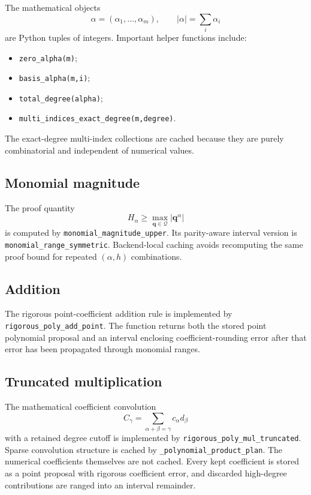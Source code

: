 \documentclass[11pt]{article}
\newcommand{\Qdom}{\mathcal{Q}}
\newcommand{\qv}{\mathbf{q}}
\begin{document}
The mathematical objects
\[
  \alpha=(\alpha_1,\ldots,\alpha_m),
  \qquad
  |\alpha|=\sum_i\alpha_i
\]
are Python tuples of integers.  Important helper functions include:
\begin{itemize}[leftmargin=*]
\item \texttt{zero\_alpha(m)};
\item \texttt{basis\_alpha(m,i)};
\item \texttt{total\_degree(alpha)};
\item \texttt{multi\_indices\_exact\_degree(m,degree)}.
\end{itemize}
The exact-degree multi-index collections are cached because they are purely
combinatorial and independent of numerical values.

\subsection{Monomial magnitude}

The proof quantity
\[
  H_\alpha\ge\max_{\qv\in\Qdom}|\qv^\alpha|
\]
is computed by \texttt{monomial\_magnitude\_upper}.  Its parity-aware interval
version is \texttt{monomial\_range\_symmetric}.  Backend-local caching avoids
recomputing the same proof bound for repeated \((\alpha,h)\) combinations.

\subsection{Addition}

The rigorous point-coefficient addition rule is implemented by
\texttt{rigorous\_poly\_add\_point}.  The function returns both the stored point
polynomial proposal and an interval enclosing coefficient-rounding error after
that error has been propagated through monomial ranges.

\subsection{Truncated multiplication}

The mathematical coefficient convolution
\[
  C_\gamma=\sum_{\alpha+\beta=\gamma}c_\alpha d_\beta
\]
with a retained degree cutoff is implemented by
\texttt{rigorous\_poly\_mul\_truncated}.  Sparse convolution structure is cached
by \texttt{\_polynomial\_product\_plan}.  The numerical coefficients themselves
are not cached.  Every kept coefficient is stored as a point proposal with
rigorous coefficient error, and discarded high-degree contributions are ranged
into an interval remainder.
\end{document}
